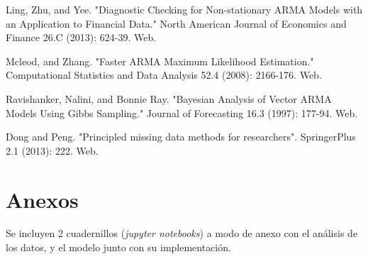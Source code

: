 \documentclass[letterpaper, 12pt]{article}
\begin{document}



\newpage
\begin{thebibliography}{3} %



Ling, Zhu, and Yee. "Diagnostic Checking for Non-stationary ARMA Models with an Application to Financial Data." North American Journal of Economics and Finance 26.C (2013): 624-39. Web.

Mcleod, and Zhang. "Faster ARMA Maximum Likelihood Estimation." Computational Statistics and Data Analysis 52.4 (2008): 2166-176. Web.

Ravishanker, Nalini, and Bonnie Ray. "Bayesian Analysis of Vector ARMA Models Using Gibbs Sampling." Journal of Forecasting 16.3 (1997): 177-94. Web.

Dong and Peng. "Principled missing data methods for researchers". SpringerPlus 2.1 (2013): 222. Web.

\end{thebibliography}

\newpage
\section*{Anexos}

Se incluyen 2 cuadernillos (\textit{jupyter notebooks}) a modo de anexo con el análisis de los datos, y el modelo junto con su implementación. \\
\end{document}
